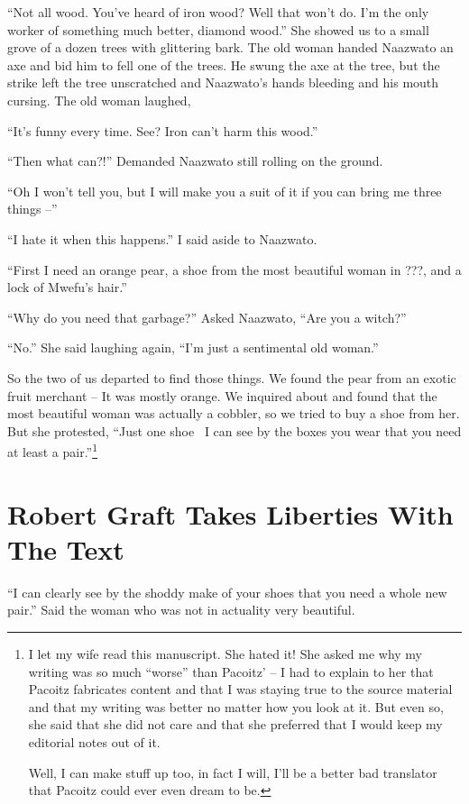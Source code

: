 ``Not all wood. You've heard of iron wood? Well that won't do. I'm the only worker of something much better, diamond wood.'' She showed us to a small grove of a dozen trees with glittering bark. The old woman handed Naazwato an axe and bid him to fell one of the trees. He swung the axe at the tree, but the strike left the tree unscratched and Naazwato's hands bleeding and his mouth cursing. The old woman laughed,

``It's funny every time. See? Iron can't harm this wood.'' 

``Then what can?!'' Demanded Naazwato still rolling on the ground.

``Oh I won't tell you, but I will make you a suit of it if you can bring me three things --''

``I hate it when this happens.'' I said aside to Naazwato.

``First I need an orange pear, a shoe from the most beautiful woman in ???, and a lock of Mwefu's hair.''

``Why do you need that garbage?'' Asked Naazwato, ``Are you a witch?''

``No.'' She said laughing again, ``I'm just a sentimental old woman.''

So the two of us departed to find those things. We found the pear from an exotic fruit merchant -- It was mostly orange. We inquired about and found that the most beautiful woman was actually a cobbler, so we tried to buy a shoe from her. But she protested, ``Just one shoe~ I can see by the boxes you wear that you need at least a pair.''\footnote{I let my wife read this manuscript. She hated it!
She asked me why my writing was so much ``worse'' than Pacoitz' -- I had to explain to her that Pacoitz fabricates content and that I was staying true to the source material and that my writing was better no matter how you look at it. But even so, she said that she did not care and that she preferred that I would keep my editorial notes out of it.

Well, I can make stuff up too, in fact I will, I'll be a better bad translator that Pacoitz could ever even dream to be.}

\chapter{Robert Graft Takes Liberties With The Text}
``I can clearly see by the shoddy make of your shoes that you need a whole new pair.'' Said the woman who was not in actuality very beautiful.

